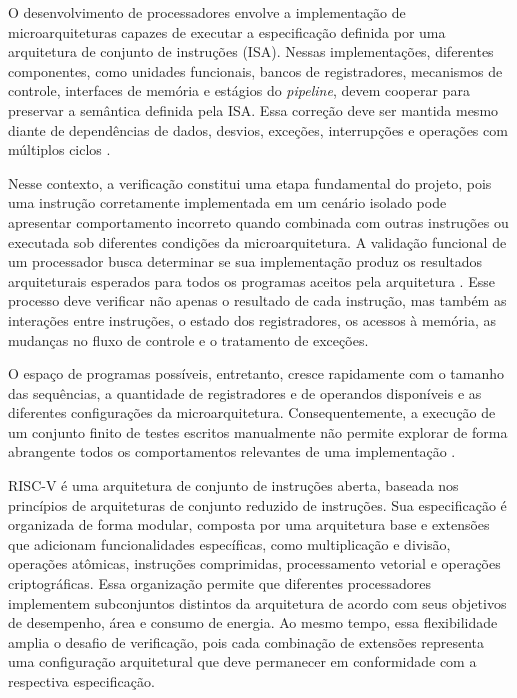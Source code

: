 O desenvolvimento de processadores envolve a implementação de microarquiteturas capazes de executar a especificação definida por uma arquitetura de conjunto de instruções (ISA). 
Nessas implementações, diferentes componentes, como unidades funcionais, bancos de registradores, mecanismos de controle, interfaces de memória e estágios do \textit{pipeline}, devem cooperar para preservar a semântica definida pela ISA. 
Essa correção deve ser mantida mesmo diante de dependências de dados, desvios, exceções, interrupções e operações com múltiplos ciclos \citep{Hennessy:2025:CA}.

Nesse contexto, a verificação constitui uma etapa fundamental do projeto, pois uma instrução corretamente implementada em um cenário isolado pode apresentar comportamento incorreto quando combinada com outras instruções ou executada sob diferentes condições da microarquitetura.
A validação funcional de um processador busca determinar se sua implementação produz os resultados arquiteturais esperados para todos os programas aceitos pela arquitetura \citep{Tain:2025:Survey}. 
Esse processo deve verificar não apenas o resultado de cada instrução, mas também as interações entre instruções, o estado dos registradores, os acessos à memória, as mudanças no fluxo de controle e o tratamento de exceções. 

O espaço de programas possíveis, entretanto, cresce rapidamente com o tamanho das sequências, a quantidade de registradores e de operandos disponíveis e as diferentes configurações da microarquitetura. 
Consequentemente, a execução de um conjunto finito de testes escritos manualmente não permite explorar de forma abrangente todos os comportamentos relevantes de uma implementação \citep{Hur:2021:DifuzzRTL}.


RISC-V \citep{RISCV:2026:ISMv1} é uma arquitetura de conjunto de instruções aberta, baseada nos princípios de arquiteturas de conjunto reduzido de instruções. Sua especificação é organizada de forma modular, composta por uma arquitetura base e extensões que adicionam funcionalidades específicas, como multiplicação e divisão, operações atômicas, instruções comprimidas, processamento vetorial e operações criptográficas. Essa organização permite que diferentes processadores implementem subconjuntos distintos da arquitetura de acordo com seus objetivos de desempenho, área e consumo de energia. Ao mesmo tempo, essa flexibilidade amplia o desafio de verificação, pois cada combinação de extensões representa uma configuração arquitetural que deve permanecer em conformidade com a respectiva especificação.

